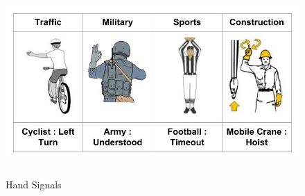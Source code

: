 \begin{figure}
	[h] \centering 
	\includegraphics[height=7cm]{figures/content/ges-signals.jpg} \caption{Hand Signals} \label{fg:ges:signal} 
\end{figure}
